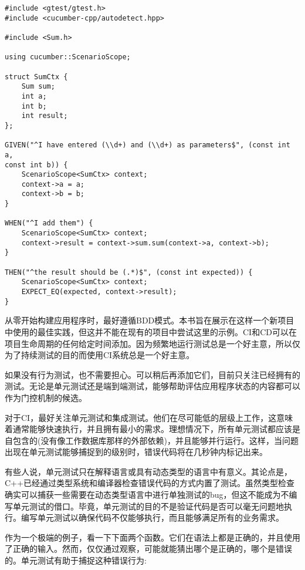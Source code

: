 \begin{lstlisting}[style=styleCXX]
#include <gtest/gtest.h>
#include <cucumber-cpp/autodetect.hpp>

#include <Sum.h>

using cucumber::ScenarioScope;

struct SumCtx {
	Sum sum;
	int a;
	int b;
	int result;
};

GIVEN("^I have entered (\\d+) and (\\d+) as parameters$", (const int a,
const int b)) {
	ScenarioScope<SumCtx> context;
	context->a = a;
	context->b = b;
}

WHEN("^I add them") {
	ScenarioScope<SumCtx> context;
	context->result = context->sum.sum(context->a, context->b);
}

THEN("^the result should be (.*)$", (const int expected)) {
	ScenarioScope<SumCtx> context;
	EXPECT_EQ(expected, context->result);
}
\end{lstlisting}

从零开始构建应用程序时，最好遵循BDD模式。本书旨在展示在这样一个新项目中使用的最佳实践，但这并不能在现有的项目中尝试这里的示例。CI和CD可以在项目生命周期的任何给定时间添加。因为频繁地运行测试总是一个好主意，所以仅为了持续测试的目的而使用CI系统总是一个好主意。

如果没有行为测试，也不需要担心。可以稍后再添加它们，目前只关注已经拥有的测试。无论是单元测试还是端到端测试，能够帮助评估应用程序状态的内容都可以作为门控机制的候选。


对于CI，最好关注单元测试和集成测试。他们在尽可能低的层级上工作，这意味着通常能够快速执行，并且拥有最小的需求。理想情况下，所有单元测试都应该是自包含的(没有像工作数据库那样的外部依赖)，并且能够并行运行。这样，当问题出现在单元测试能够捕捉到的级别时，错误代码将在几秒钟内标记出来。

有些人说，单元测试只在解释语言或具有动态类型的语言中有意义。其论点是，C++已经通过类型系统和编译器检查错误代码的方式内置了测试。虽然类型检查确实可以捕获一些需要在动态类型语言中进行单独测试的bug，但这不能成为不编写单元测试的借口。毕竟，单元测试的目的不是验证代码是否可以毫无问题地执行。编写单元测试以确保代码不仅能够执行，而且能够满足所有的业务需求。

作为一个极端的例子，看一下下面两个函数。它们在语法上都是正确的，并且使用了正确的输入。然而，仅仅通过观察，可能就能猜出哪个是正确的，哪个是错误的。单元测试有助于捕捉这种错误行为:

